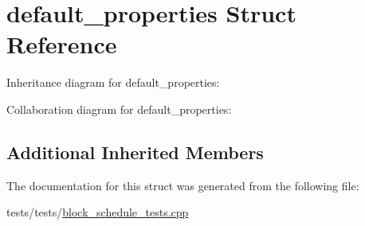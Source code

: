 \hypertarget{structdefault__properties}{}\section{default\+\_\+properties Struct Reference}
\label{structdefault__properties}


Inheritance diagram for default\+\_\+properties\+:


Collaboration diagram for default\+\_\+properties\+:
\subsection*{Additional Inherited Members}


The documentation for this struct was generated from the following file\+:\begin{DoxyCompactItemize}
\item 
tests/tests/\mbox{\hyperlink{block__schedule__tests_8cpp}{block\+\_\+schedule\+\_\+tests.\+cpp}}\end{DoxyCompactItemize}
